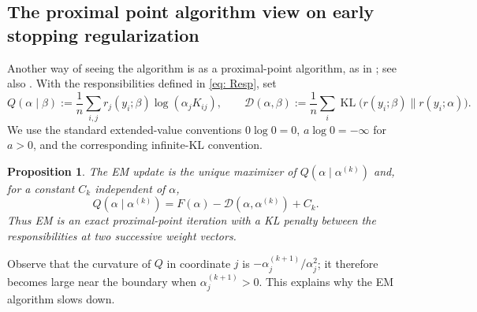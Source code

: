 \documentclass[12pt]{iopart}
\newtheorem{prop}{Proposition}
\theoremstyle{remark}
\begin{document}
\subsection{The proximal point algorithm view on early stopping regularization}

Another way of seeing the algorithm is as a proximal-point algorithm, as in
\citet{chretien2008algorithms}; see also \citet{keys2019proximal}. With the
responsibilities defined in \eqref{eq: Resp}, set
\[
Q(\alpha\mid\beta):=\frac1n\sum_{i,j}r_j(y_i;\beta)
\log(\alpha_jK_{ij}),
\qquad
\mathcal D(\alpha,\beta):=\frac1n\sum_i
\operatorname{KL}\big(r(y_i;\beta)\big\| r(y_i;\alpha)\big).
\]
We use the standard extended-value conventions $0\log0=0$,
$a\log0=-\infty$ for $a>0$, and the corresponding infinite-KL convention.

\medskip \medskip 

\begin{prop}
\label{prop: Prox}
The EM update is the unique maximizer of $Q(\alpha\mid\alpha^{(k)})$ and,
for a constant $C_k$ independent of $\alpha$,
\begin{equation}
\label{eq: Prox}
Q(\alpha\mid\alpha^{(k)})
=F(\alpha)-\mathcal D(\alpha,\alpha^{(k)})+C_k.
\end{equation}
Thus EM is an exact proximal-point iteration with a KL penalty between the
responsibilities at two successive weight vectors.
\end{prop}
Observe that the curvature of $Q$ in coordinate $j$ is
$-\alpha_j^{(k+1)}/\alpha_j^2$; it therefore becomes large near the boundary
when $\alpha_j^{(k+1)}>0$. This explains why the EM algorithm slows down. 
\end{document}
